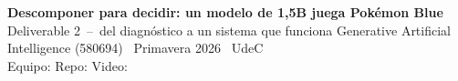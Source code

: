 \documentclass[10pt,a4paper]{extarticle}
\begin{document}
\small

\begin{tcolorbox}[colback=navy,colframe=navy,boxrule=0pt,left=3mm,right=3mm,top=1.6mm,bottom=1.6mm,arc=1mm]
{\color{white}\bfseries\Large Descomponer para decidir: un modelo de 1{,}5B juega Pok\'emon Blue}\\[0.9mm]
{\color{white!85}\normalsize Deliverable 2 \,--\, del diagn\'ostico a un sistema que funciona}\hfill
{\color{white!75}\footnotesize Generative Artificial Intelligence (580694) \textbullet\ Primavera 2026 \textbullet\ UdeC}\\[1.3mm]
{\footnotesize\color{white!85}Equipo:} {\footnotesize\bfseries\color{white}\EQUIPO}\hfill
{\footnotesize\color{white!85}Repo:} {\footnotesize\color{white}\texttt{\REPO}}\hfill
{\footnotesize\color{white!85}Video:} {\footnotesize\color{white}\texttt{\VIDEO}}
\end{tcolorbox}
\end{document}
